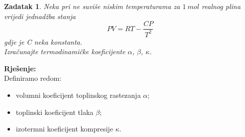\documentclass[a4paper,12pt]{article}
\newtheorem{ZDK}{Zadatak}[section]
\begin{document}
\begin{ZDK}
Neka pri ne suvi\v{s}e niskim temperaturama za $1\ mol$ realnog plina vrijedi jednad\v{z}ba stanja
	$$ PV=RT-\frac{CP}{T^2} $$
	gdje je C neka konstanta. \\
	Izra\v{c}unajte termodinami\v{c}ke koeficijente $\alpha$, $\beta$, $\kappa$.
\end{ZDK}
\textbf{Rje\v{s}enje:} \\
\newline
Definiramo redom:
\begin{itemize}
	\item volumni koeficijent toplinskog rastezanja $\alpha$;
	\item toplinski koeficijent tlaka $\beta$;
	\item izotermni koeficijent kompresije $\kappa$.
\end{itemize}
\end{document}
